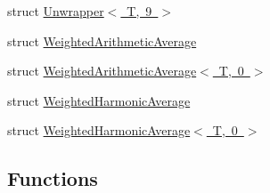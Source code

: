 \begin{DoxyCompactItemize}
struct \mbox{\hyperlink{structmpc_1_1utilities_1_1_unwrapper_3_01_t_00_019_01_4}{Unwrapper$<$ T, 9 $>$}}
\item 
struct \mbox{\hyperlink{structmpc_1_1utilities_1_1_weighted_arithmetic_average}{Weighted\+Arithmetic\+Average}}
\item 
struct \mbox{\hyperlink{structmpc_1_1utilities_1_1_weighted_arithmetic_average_3_01_t_00_010_01_4}{Weighted\+Arithmetic\+Average$<$ T, 0 $>$}}
\item 
struct \mbox{\hyperlink{structmpc_1_1utilities_1_1_weighted_harmonic_average}{Weighted\+Harmonic\+Average}}
\item 
struct \mbox{\hyperlink{structmpc_1_1utilities_1_1_weighted_harmonic_average_3_01_t_00_010_01_4}{Weighted\+Harmonic\+Average$<$ T, 0 $>$}}
\end{DoxyCompactItemize}
\subsection*{Functions}
